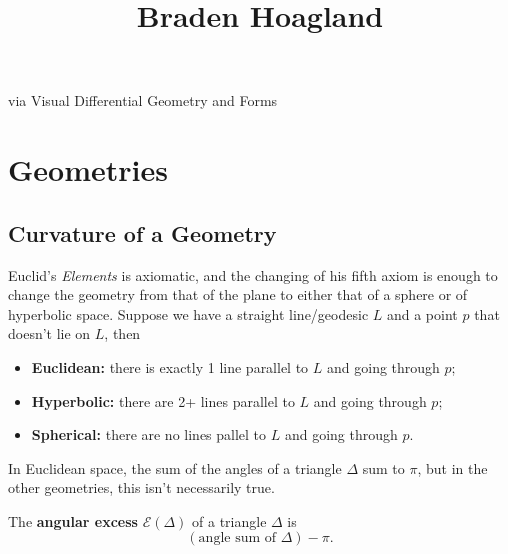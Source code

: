 \documentclass[twoside,10pt]{report}
\begin{document}
\title{Braden Hoagland}{via Visual Differential Geometry and Forms}




\chapter{Geometries}

\section{Curvature of a Geometry}

Euclid's \textit{Elements} is axiomatic, and the changing of his fifth axiom is enough to change the geometry from that of the plane to either that of a sphere or of hyperbolic space. Suppose we have a straight line/geodesic $L$ and a point $p$ that doesn't lie on $L$, then
\begin{itemize}
	\item \textbf{Euclidean:} there is exactly 1 line parallel to $L$ and going through $p$;
	\item \textbf{Hyperbolic:} there are 2+ lines parallel to $L$ and going through $p$;
	\item \textbf{Spherical:} there are no lines pallel to $L$ and going through $p$.
\end{itemize}

In Euclidean space, the sum of the angles of a triangle $\Delta$ sum to $\pi$, but in the other geometries, this isn't necessarily true.

\begin{defn}[]
The \textbf{angular excess} $\mathcal{E}(\Delta)$ of a triangle $\Delta$ is
\[
	(\text{angle sum of } \Delta) - \pi.
\] 
\end{defn}
\end{document}

